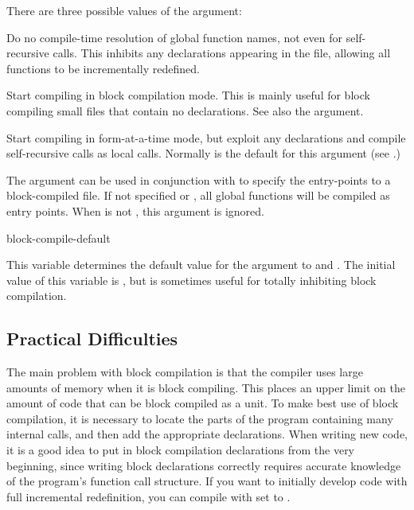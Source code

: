 There are three possible values of the  argument:
\begin{Lentry}
  
\item[\false{}] Do no compile-time resolution of global function
  names, not even for self-recursive calls.  This inhibits any
   declarations appearing in the file, allowing all
  functions to be incrementally redefined.
  
\item[\true{}] Start compiling in block compilation mode.  This is
  mainly useful for block compiling small files that contain no
   declarations.  See also the 
  argument.
  
\item[\kwd{specified}] Start compiling in form-at-a-time mode, but
  exploit any  declarations and compile
  self-recursive calls as local calls.  Normally  is
  the default for this argument (see .)
\end{Lentry}

The  argument can be used in conjunction with
 to specify the entry-points to a
block-compiled file.  If not specified or \nil, all global functions
will be compiled as entry points.  When  is not
\true, this argument is ignored.

\begin{defvar}{}{block-compile-default}
  
  This variable determines the default value for the
   argument to  and
  .  The initial value of this variable is
  , but \false{} is sometimes useful for totally
  inhibiting block compilation.
\end{defvar}


\subsection{Practical Difficulties}

The main problem with block compilation is that the compiler uses
large amounts of memory when it is block compiling.  This places an
upper limit on the amount of code that can be block compiled as a
unit.  To make best use of block compilation, it is necessary to
locate the parts of the program containing many internal calls, and
then add the appropriate  declarations.  When writing
new code, it is a good idea to put in block compilation declarations
from the very beginning, since writing block declarations correctly
requires accurate knowledge of the program's function call structure.
If you want to initially develop code with full incremental
redefinition, you can compile with  set to
\false.


